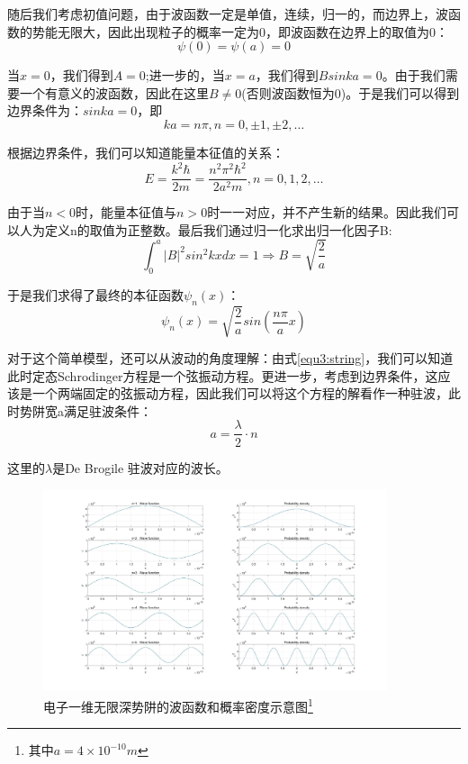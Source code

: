 随后我们考虑初值问题，由于波函数一定是单值，连续，归一的，而边界上，波函数的势能无限大，因此出现粒子的概率一定为0，即波函数在边界上的取值为0：
\begin{equation}
    \psi(0)=\psi(a)=0
\end{equation}

当$x=0$，我们得到$A=0$;进一步的，当$x=a$，我们得到$Bsinka=0$。由于我们需要一个有意义的波函数，因此在这里$B\ne 0$(否则波函数恒为0)。于是我们可以得到边界条件为：$sinka=0$，即
\begin{equation}
    ka=n\pi ,n=0,\pm 1,\pm 2,\ldots
\end{equation}

根据边界条件，我们可以知道能量本征值的关系：
\begin{equation}
    E=\frac{k^2\hbar}{2m}=\frac{n^2\pi^2 \hbar^2}{2a^2m},n=0,1,2,\ldots 
\end{equation}

由于当$n<0$时，能量本征值与$n>0$时一一对应，并不产生新的结果。因此我们可以人为定义n的取值为正整数。最后我们通过归一化求出归一化因子B:
\begin{equation}
    \int_0^a |B|^2sin^2kx dx =1 \Rightarrow B=\sqrt{\frac{2}{a}}
\end{equation}

于是我们求得了最终的本征函数$\psi_n(x)$：
\begin{equation}
    \psi_n(x)=\sqrt{\frac{2}{a}}sin(\frac{n\pi}{a}x)
\end{equation}

对于这个简单模型，还可以从波动的角度理解：由式\ref{equ3:string}，我们可以知道此时定态Schrodinger方程是一个弦振动方程。更进一步，考虑到边界条件，这应该是一个两端固定的弦振动方程，因此我们可以将这个方程的解看作一种驻波，此时势阱宽a满足驻波条件：
\begin{equation}
    a=\frac{\lambda}{2}\cdot n
\end{equation}

这里的$\lambda$是De Brogile 驻波对应的波长。

\begin{figure}[htp]
    \centering
    \includegraphics[width=0.9\textwidth]{figure/1Dinfinite.jpg}
    \caption{电子一维无限深势阱的波函数和概率密度示意图\footnote{其中$a=4\times 10^{-10}m$}}
    \label{infinite}
\end{figure}
